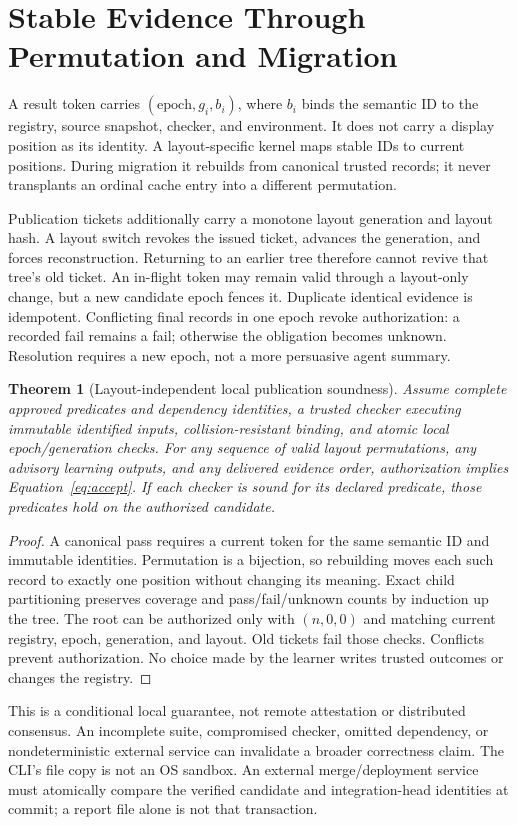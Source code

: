 \documentclass[11pt]{article}
\newtheorem{theorem}{Theorem}\newtheorem{proposition}[theorem]{Proposition}\newtheorem{lemma}[theorem]{Lemma}
\theoremstyle{definition}\newtheorem{definition}[theorem]{Definition}
\begin{document}
\section{Stable Evidence Through Permutation and Migration}\label{sec:safety}
A result token carries $(\mathrm{epoch},g_i,b_i)$, where $b_i$ binds the semantic ID to the registry, source snapshot, checker, and environment. It does not carry a display position as its identity. A layout-specific kernel maps stable IDs to current positions. During migration it rebuilds from canonical trusted records; it never transplants an ordinal cache entry into a different permutation.

Publication tickets additionally carry a monotone layout generation and layout hash. A layout switch revokes the issued ticket, advances the generation, and forces reconstruction. Returning to an earlier tree therefore cannot revive that tree's old ticket. An in-flight token may remain valid through a layout-only change, but a new candidate epoch fences it. Duplicate identical evidence is idempotent. Conflicting final records in one epoch revoke authorization: a recorded fail remains a fail; otherwise the obligation becomes unknown. Resolution requires a new epoch, not a more persuasive agent summary.

\begin{theorem}[Layout-independent local publication soundness]\label{thm:safety}
Assume complete approved predicates and dependency identities, a trusted checker executing immutable identified inputs, collision-resistant binding, and atomic local epoch/generation checks. For any sequence of valid layout permutations, any advisory learning outputs, and any delivered evidence order, authorization implies Equation~\eqref{eq:accept}. If each checker is sound for its declared predicate, those predicates hold on the authorized candidate.
\end{theorem}
\begin{proof}
A canonical pass requires a current token for the same semantic ID and immutable identities. Permutation is a bijection, so rebuilding moves each such record to exactly one position without changing its meaning. Exact child partitioning preserves coverage and pass/fail/unknown counts by induction up the tree. The root can be authorized only with $(n,0,0)$ and matching current registry, epoch, generation, and layout. Old tickets fail those checks. Conflicts prevent authorization. No choice made by the learner writes trusted outcomes or changes the registry.\end{proof}
This is a conditional local guarantee, not remote attestation or distributed consensus. An incomplete suite, compromised checker, omitted dependency, or nondeterministic external service can invalidate a broader correctness claim. The CLI's file copy is not an OS sandbox. An external merge/deployment service must atomically compare the verified candidate and integration-head identities at commit; a report file alone is not that transaction.
\end{document}
